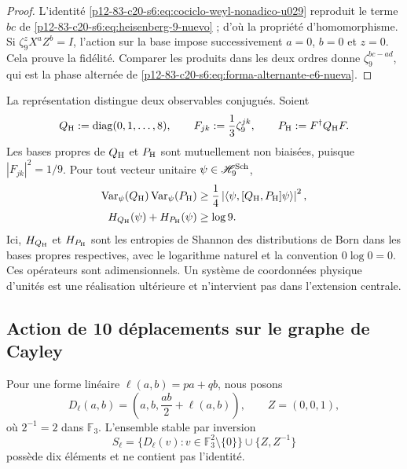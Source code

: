 \begin{proof}
L’identité \eqref{p12-83-c20-s6:eq:cociclo-weyl-nonadico-u029} reproduit le terme
\(bc\) de \eqref{p12-83-c20-s6:eq:heisenberg-9-nuevo} ; d’où la propriété
d’homomorphisme. Si \(\zeta_9^zX^aZ^b=I\), l’action sur la base impose
successivement \(a=0\), \(b=0\) et \(z=0\). Cela prouve la fidélité. Comparer
les produits dans les deux ordres donne
\(\zeta_9^{bc-ad}\), qui est la phase alternée de
\eqref{p12-83-c20-s6:eq:forma-alternante-e6-nueva}.
\end{proof}

La représentation distingue deux observables conjugués. Soient
\[
 Q_{\rm H}:=\operatorname{diag}(0,1,\ldots,8),
 \qquad
 F_{jk}:=\frac13\zeta_9^{jk},
 \qquad
 P_{\rm H}:=F^\dagger Q_{\rm H}F.
\]
Les bases propres de \(Q_{\rm H}\) et \(P_{\rm H}\) sont mutuellement non biaisées, puisque \(|F_{jk}|^2=1/9\). Pour tout vecteur unitaire \(\psi\in\mathscr H_9^{\rm Sch}\),
\begin{align}
 \operatorname{Var}_\psi(Q_{\rm H})
 \operatorname{Var}_\psi(P_{\rm H})
 &\ge
 \frac14\left|
 \langle\psi,[Q_{\rm H},P_{\rm H}]\psi\rangle
 \right|^2,
 \label{p12-83-c20-s6:eq:incertidumbre-weyl-u029}\\
 H_{Q_{\rm H}}(\psi)+H_{P_{\rm H}}(\psi)
 &\ge\log9.
 \label{p12-83-c20-s6:eq:incertidumbre-entropica-weyl-u029}
\end{align}
Ici, \(H_{Q_{\rm H}}\) et \(H_{P_{\rm H}}\) sont les entropies de Shannon
des distributions de Born dans les bases propres respectives,
avec le logarithme naturel et la convention \(0\log0=0\).
Ces opérateurs sont adimensionnels. Un système de coordonnées physique d’unités est une
réalisation ultérieure et n’intervient pas dans l’extension centrale.

\subsection{Action de 10 déplacements sur le graphe de Cayley}

Pour une forme linéaire \(\ell(a,b)=pa+qb\), nous posons
\[
 D_\ell(a,b)=\left(a,b,\frac{ab}{2}+\ell(a,b)\right),
 \qquad Z=(0,0,1),
\]
où \(2^{-1}=2\) dans \(\mathbb F_3\). L'ensemble stable par inversion
\begin{equation}
 S_\ell=
 \{D_\ell(v):v\in\mathbb F_3^2\setminus\{0\}\}
 \cup\{Z,Z^{-1}\}
 \label{p12-83-c20-s6:eq:conjunto-conexion-e6}
\end{equation}
possède dix éléments et ne contient pas l'identité.


